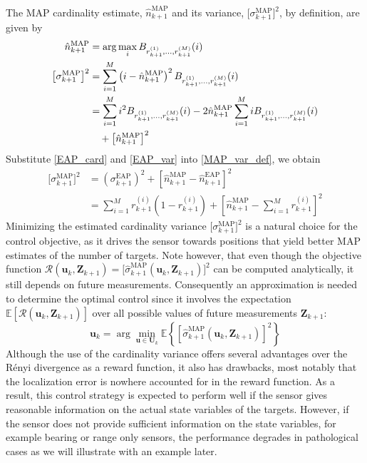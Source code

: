 \documentclass[twocolumn]{autart}
\begin{document}
The MAP cardinality estimate, $\hat{n}^{\text{MAP}}_{k+1}$ and its variance,
$\big[\sigma^{\text{MAP}}_{k+1}\big]^2$, by definition, are given by
\begin{align}
\hat{n}^{\text{MAP}}_{k+1}&=\arg\max_i B_{r_{k+1}^{(1)},\ldots ,
r_{k+1}^{(M)}}(i)  \label{card_est} \\
\big[\sigma^{\text{MAP}}_{k+1}\big]^2&=\sum_{i=1}^M \left(i-\hat{n}^{\text{MAP}}_{k+1}\right)^2B_{r_{k+1}^{(1)},\ldots , r_{k+1}^{(M)}}(i) \\
&=\sum_{i=1}^M i^2B_{r_{k+1}^{(1)},\ldots , r_{k+1}^{(M)}}(i) - 2\hat{n}^{\text{MAP}}_{k+1}\sum_{i=1}^M iB_{r_{k+1}^{(1)},\ldots ,
r_{k+1}^{(M)}}(i)\notag\\
&\quad + \left[\hat{n}^{\text{MAP}}_{k+1}\right]^2
\label{MAP_var_def}
\end{align}
Substitute \eqref{EAP_card} and \eqref{EAP_var} into \eqref{MAP_var_def}, we obtain
\begin{align}
\big[\sigma _{k+1}^{\text{MAP}}\big]^{2}& =\left( \sigma _{k+1}^{\text{EAP}}\right) ^{2}+\left[ \hat{n}_{k+1}^{\text{MAP}}-\hat{n}_{k+1}^{\text{EAP}}\right] ^{2} \\
& =\sum_{i=1}^{M}r_{k+1}^{(i)}\left( 1-r_{k+1}^{(i)}\right) +\left[ \hat{n}_{k+1}^{\text{MAP}}-\sum_{i=1}^{M}r_{k+1}^{(i)}\right] ^{2}  \label{sigm_sq}
\end{align}
Minimizing the estimated cardinality variance $\big[\sigma _{k+1}^{\text{MAP}}\big]^{2}$ is a natural choice for the control objective, as it drives the
sensor towards positions that yield better MAP estimates of the number of
targets. Note however, that even though the objective function $\mathcal{R}(\mathbf{u}_{k},\mathbf{Z}_{k+1})=\big[\hat{\sigma}_{k+1}^{\text{MAP}}(\mathbf{u}_{k},\mathbf{Z}_{k+1})\big]^{2}$ can be computed analytically, it
still depends on future measurements. Consequently an approximation is
needed to determine the optimal control since it involves the expectation $\mathbb{E}\left[ \mathcal{R}(\mathbf{u}_{k},\mathbf{Z}_{k+1})\right] $ over
all possible values of future measurements $\mathbf{Z}_{k+1}$:
\begin{equation}
\mathbf{u}_{k}=\arg \min_{\mathbf{u}\in \mathbf{U}_{k}}\mathbb{E}\left\{ \left[ \hat{\sigma}_{k+1}^{\text{MAP}}(\mathbf{u}_{k},\mathbf{Z}_{k+1})\right] ^{2}\right\}   \label{obj2}
\end{equation}
Although the use of the cardinality variance offers several advantages over
the R\'{e}nyi divergence as a reward function, it also has drawbacks, most
notably that the localization error is nowhere accounted for in the reward
function. As a result, this control strategy is expected to perform well if
the sensor gives reasonable information on the actual state variables of the
targets. However, if the sensor does not provide sufficient information on
the state variables, for example bearing or range only sensors, the
performance degrades in pathological cases as we will illustrate with an
example later.
\end{document}
